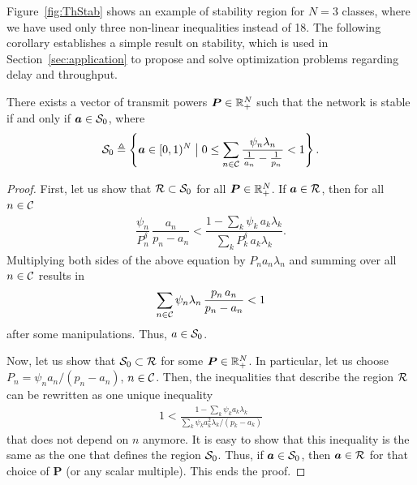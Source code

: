 Figure~\ref{fig:ThStab} shows an example of stability region for $N=3$ classes, where we have used only three non-linear inequalities instead of 18.
%
The following corollary establishes a simple result on stability, which is used in Section~\ref{sec:application} to propose and solve optimization problems regarding delay and throughput.

\begin{corollary} \label{cor:stab}
	There exists a vector of transmit powers  ${\bm{P} \in \R_+^N}$ such that the network is stable if and only if $\bm{a}\in\cal{S}_0$, where
    \begin{equation*}
    	\cal{S}_0 \triangleq \left\lbrace \bm{a}\in[0,1)^N \bigm\vert 0 \le \sum_{n\in\cal{C}} \dfrac{\psi_n \lambda_n}{\frac{1}{a_n}-\frac{1}{p_n}} < 1 \right\rbrace.
    \end{equation*}
\end{corollary}
\begin{proof}
    First, let us show that $\cal{R} \subset \cal{S}_0$ for all ${\bm{P} \in \R_+^N}$.
    If $\bm{a}\in\cal{R}$, then for all $n\in\cal{C}$
    \begin{align*}
        \dfrac{\psi_n}{P_n^\delta}\,\dfrac{a_n}{p_n-a_n} < 
        \dfrac{1 - \sum_{k} \psi_k\,a_k \lambda_k}
        {\sum_{k} P_k^{\delta}\,a_k \lambda_k}.
    \end{align*}
    Multiplying both sides of the above equation by $P_n a_n \lambda_n$ and summing over all $n\in\cal{C}$ results in \vspace{-5mm}
    \begin{align*}
        \sum_{n\in\cal{C}} \psi_n \lambda_n\,\dfrac{p_n\,a_n}{p_n-a_n} < 1
    \end{align*}
    after some manipulations. Thus, $a\in\cal{S}_0$.
    
    Now, let us show that $\cal{S}_0 \subset \cal{R}$ for some $\bm{P}\in\R_+^N$.
    In particular, let us choose $P_n = \psi_n a_n/(p_n-a_n)$, $n\in\cal{C}$. Then, the inequalities that describe the region $\cal{R}$ can be rewritten as one unique inequality
    \begin{align*}
        1 < \frac{1 - \sum_{k} \psi_k a_k \lambda_k}
            {\sum_k \psi_k a_k^2 \lambda_k / (p_k-a_k)}
    \end{align*}
    that does not depend on $n$ anymore. It is easy to show that this inequality is the same as the one that defines the region $\cal{S}_0$. Thus, if $\bm{a}\in\cal{S}_0$, then $\bm{a}\in\cal{R}$ for that choice of $\bm{P}$ (or any scalar multiple). This ends the proof.
\end{proof}

